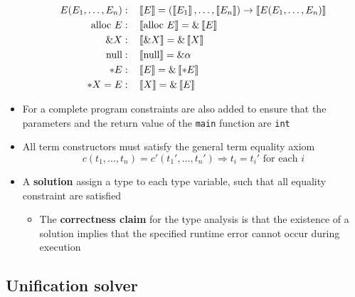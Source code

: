 \begin{itemize}
\begin{align*}
    E(E_1, \dots, E_n) : & \quad \left\llbracket E\right\rrbracket = (\left\llbracket E_1\right\rrbracket, \dots, \left\llbracket E_n\right\rrbracket) \to \left\llbracket E(E_1, \dots, E_n)\right\rrbracket \\
    \text{alloc } E : & \quad \left\llbracket\text{alloc } E\right\rrbracket =  \& \left\llbracket E\right\rrbracket \\
    \& X : & \quad \left\llbracket\& X\right\rrbracket = \& \left\llbracket X\right\rrbracket \\
    \text{null} : & \quad \left\llbracket\text{null}\right\rrbracket = \& \alpha \\
    *E : & \quad \left\llbracket E\right\rrbracket = \&\left\llbracket*E\right\rrbracket \\
    *X = E : & \quad \left\llbracket X\right\rrbracket= \& \left\llbracket E\right\rrbracket
  \end{align*}
  \item For a complete program constraints are also added to ensure that the parameters and the return value of the \texttt{main} function are \texttt{int}
  \item All term constructors must satisfy the general term equality axiom
  \begin{equation*}
    c(t_1, \dots, t_n) = c'(t_1', \dots, t_n') \Rightarrow t_i = t_i' \text{ for each } i
  \end{equation*}
  \item A \textbf{solution} assign a type to each type variable, such that all equality constraint are satisfied
  \begin{itemize}
  	\item The \textbf{correctness claim} for the type analysis is that the existence of a solution implies that the specified runtime error cannot occur during execution
  \end{itemize}
\end{itemize}

\subsection{Unification solver}

